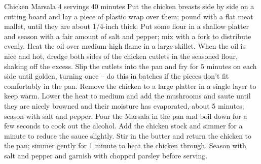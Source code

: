 \begin{recipe}{Chicken Marsala} {4 servings} {40 minutes}
Put the chicken breasts side by side on a cutting board and lay a piece of plastic wrap over them; pound with a flat meat mallet, until they are about 1/4-inch thick. Put some flour in a shallow platter and season with a fair amount of salt and pepper; mix with a fork to distribute evenly.
Heat the oil over medium-high flame in a large skillet. When the oil is nice and hot, dredge both sides of the chicken cutlets in the seasoned flour, shaking off the excess. Slip the cutlets into the pan and fry for 5 minutes on each side until golden, turning once – do this in batches if the pieces don't fit comfortably in the pan. Remove the chicken to a large platter in a single layer to keep warm.
Lower the heat to medium and add the mushrooms and saute until they are nicely browned and their moisture has evaporated, about 5 minutes; season with salt and pepper. Pour the Marsala in the pan and boil down for a few seconds to cook out the alcohol. 
Add the chicken stock and simmer for a minute to reduce the sauce slightly. Stir in the butter and return the chicken to the pan; simmer gently for 1 minute to heat the chicken through. Season with salt and pepper and garnish with chopped parsley before serving.
\end{recipe}

